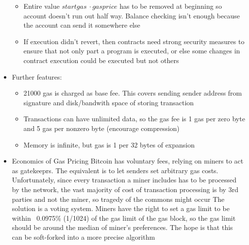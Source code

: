 \documentclass{article}
\begin{document}
\begin{itemize}
\begin{itemize}
      \item Entire value $startgas\ \cdot gasprice$ has to be removed at beginning so account doesn't run out half way. 
        \subitem Balance checking isn't enough because the account can send it somewhere else
      \item If execution didn't revert, then contracts need strong security measures to ensure that not only part a program is executed, or else
        some changes in contract execution could be executed but not others
    \end{itemize}
  \item Further features:
    \begin{itemize}
      \item 21000 gas is charged as base fee. This covers sending sender address from signature and disk/bandwith space of storing transaction
      \item Transactions can have unlimited data, so the gas fee is 1 gas per zero byte and 5 gas per nonzero byte (encourage compression)
      \item Memory is infinite, but gas is 1 per 32 bytes of expansion
    \end{itemize}
  \item Economics of Gas Pricing
    \subitem Bitcoin has voluntary fees, relying on miners to act as gatekeeprs.
    \subitem The equivalent is to let senders set arbitrary gas costs. Unfortunately, since
    every transaction a miner includes has to be processed by the network, the vast majority
    of cost of transaction processing is by 3rd parties and not the miner, so tragedy of the commons might occur
    \subitem The solution is a voting system. Miners have the right to set a gas limit to be within
    ~0.0975\% (1/1024) of the gas limit of the gas block, so the gas limit should be around the median of
    miner's preferences. 
    \subitem The hope is that this can be soft-forked into a more precise algorithm
\end{itemize}
\end{document}
